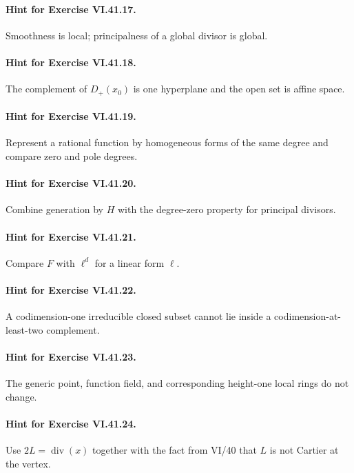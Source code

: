 \paragraph{Hint for Exercise VI.41.17.}
Smoothness is local; principalness of a global divisor is global.

\paragraph{Hint for Exercise VI.41.18.}
The complement of \(D_+(x_0)\) is one hyperplane and the open set is affine space.

\paragraph{Hint for Exercise VI.41.19.}
Represent a rational function by homogeneous forms of the same degree and compare zero and pole degrees.

\paragraph{Hint for Exercise VI.41.20.}
Combine generation by \(H\) with the degree-zero property for principal divisors.

\paragraph{Hint for Exercise VI.41.21.}
Compare \(F\) with \(\ell^d\) for a linear form \(\ell\).

\paragraph{Hint for Exercise VI.41.22.}
A codimension-one irreducible closed subset cannot lie inside a codimension-at-least-two complement.

\paragraph{Hint for Exercise VI.41.23.}
The generic point, function field, and corresponding height-one local rings do not change.

\paragraph{Hint for Exercise VI.41.24.}
Use \(2L=\operatorname{div}(x)\) together with the fact from VI/40 that \(L\) is not Cartier at the vertex.
